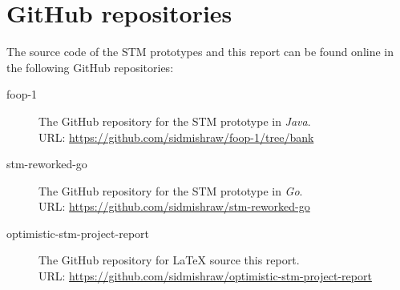 \documentclass[../main]{subfiles}
\begin{document}
  \section{GitHub repositories}

  \par
  The source code of the STM prototypes and this report can be found online in the following GitHub repositories: \par

  \begin{description}

    \item[foop-1] The GitHub repository for the STM prototype in {\em Java}. \\
    URL: \url{https://github.com/sidmishraw/foop-1/tree/bank}

    \item[stm-reworked-go] The GitHub repository for the STM prototype in {\em Go}. \\
    URL: \url{https://github.com/sidmishraw/stm-reworked-go}

    \item[optimistic-stm-project-report] The GitHub repository for {\LaTeX} source this report. \\
    URL: \url{https://github.com/sidmishraw/optimistic-stm-project-report}

  \end{description}

  \pagebreak %
\end{document}
